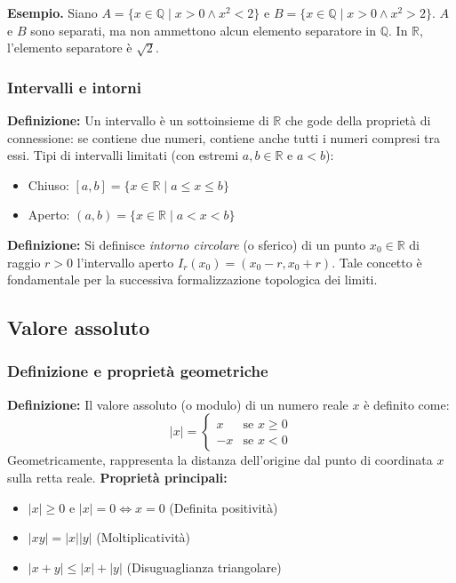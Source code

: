 \textbf{Esempio.} Siano $A=\{x \in \mathbb{Q} \mid x>0 \land x^2<2\}$ e $B=\{x \in \mathbb{Q} \mid x>0 \land x^2>2\}$. $A$ e $B$ sono separati, ma non ammettono alcun elemento separatore in $\mathbb{Q}$. In $\mathbb{R}$, l'elemento separatore è $\sqrt{2}$.

\subsubsection{Intervalli e intorni}
\textbf{Definizione:} Un intervallo è un sottoinsieme di $\mathbb{R}$ che gode della proprietà di connessione: se contiene due numeri, contiene anche tutti i numeri compresi tra essi. 
Tipi di intervalli limitati (con estremi $a, b \in \mathbb{R}$ e $a < b$):
\begin{itemize}
    \item Chiuso: $[a,b] = \{x \in \mathbb{R} \mid a \le x \le b\}$
    \item Aperto: $(a,b) = \{x \in \mathbb{R} \mid a < x < b\}$
\end{itemize}
\textbf{Definizione:} Si definisce \textit{intorno circolare} (o sferico) di un punto $x_0 \in \mathbb{R}$ di raggio $r > 0$ l'intervallo aperto $I_r(x_0) = (x_0 - r, x_0 + r)$. Tale concetto è fondamentale per la successiva formalizzazione topologica dei limiti.

\subsection{Valore assoluto}
\subsubsection{Definizione e proprietà geometriche}
\textbf{Definizione:} Il valore assoluto (o modulo) di un numero reale $x$ è definito come:
\[
|x| = \begin{cases} 
x & \text{se } x \ge 0 \\ 
-x & \text{se } x < 0 
\end{cases}
\]
Geometricamente, rappresenta la distanza dell'origine dal punto di coordinata $x$ sulla retta reale.
\textbf{Proprietà principali:}
\begin{itemize}
    \item $|x| \ge 0$ e $|x| = 0 \iff x = 0$ (Definita positività)
    \item $|xy| = |x||y|$ (Moltiplicatività)
    \item $|x+y| \le |x| + |y|$ (Disuguaglianza triangolare)
\end{itemize}

